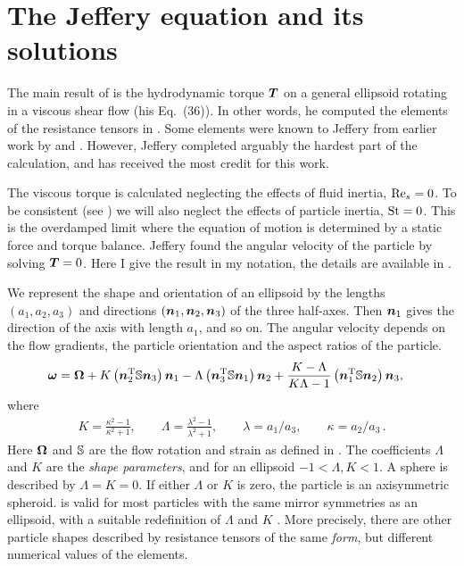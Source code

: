 \documentclass[thesis.tex]{subfiles}
\begin{document}
\section{The Jeffery equation and its solutions}

The main result of \citet{jeffery1922} is the hydrodynamic torque $\mbox{\boldmath$T$}$ on a general ellipsoid rotating in a viscous shear flow (his Eq.~(36)). In other words, he computed the elements of the resistance tensors in . Some elements were known to Jeffery from earlier work by \citet{oberbeck1876} and \citet{edwardes1893}. However, Jeffery completed arguably the hardest part of the calculation, and has received the most credit for this work.

The viscous torque is calculated neglecting the effects of fluid inertia, $\textrm{Re}_s=0$. To be consistent (see ) we will also neglect the effects of particle inertia, $\mbox{St}=0$. This is the overdamped limit where the equation of motion is determined by a static force and torque balance. Jeffery found the angular velocity of the particle by solving $\mbox{\boldmath$T$}=0$. Here I give the result in my notation, the details are available in .

We represent the shape and orientation of an ellipsoid by the lengths $(a_1, a_2, a_3)$ and directions $(\mbox{\boldmath$n$}_1, \mbox{\boldmath$n$}_2, \mbox{\boldmath$n$}_3)$ of the three half-axes. Then $\mbox{\boldmath$n$}_1$ gives the direction of the axis with length $a_1$, and so on. The angular velocity depends on the flow gradients, the particle orientation and the aspect ratios of the particle. 
\begin{align}
	\ve \omega &= \ve \Omega
	 + K\left(\ve n_2\transpose \ma S\ve n_3\right)\ve n_1
	 - \Lambda\left(\ve n_3\transpose \ma S\ve n_1\right)\ve n_2
	  + \frac{K- \Lambda}{K \Lambda - 1}\left(\ve n_1\transpose \ma S\ve n_2\right)\ve n_3,\eqnlab{triaxialomega}
\end{align}
where
\begin{align}
	K=\frac{\kappa^2-1}{\kappa^2+1}, \qquad \Lambda=\frac{\lambda^2-1}{\lambda^2+1},\qquad \lambda=a_1/a_3, \qquad \kappa=a_2/a_3\,.
\end{align}
Here $\mbox{\boldmath$\Omega$}$ and $\mathbb{S}$ are the flow rotation and strain as defined in . The coefficients $\Lambda$ and $K$ are the \emph{shape parameters}, and for an ellipsoid $-1 < \Lambda, K < 1$. A sphere is described by $\Lambda=K=0$. If either $\Lambda$ or $K$ is zero, the particle is an axisymmetric spheroid.  is valid for most particles with the same mirror symmetries as an ellipsoid, with a suitable redefinition of $\Lambda$ and $K$ \cite{bretherton1962,happel1965,kim1991}. More precisely, there are other particle shapes described by resistance tensors of the same \emph{form}, but different numerical values of the elements.
\end{document}
